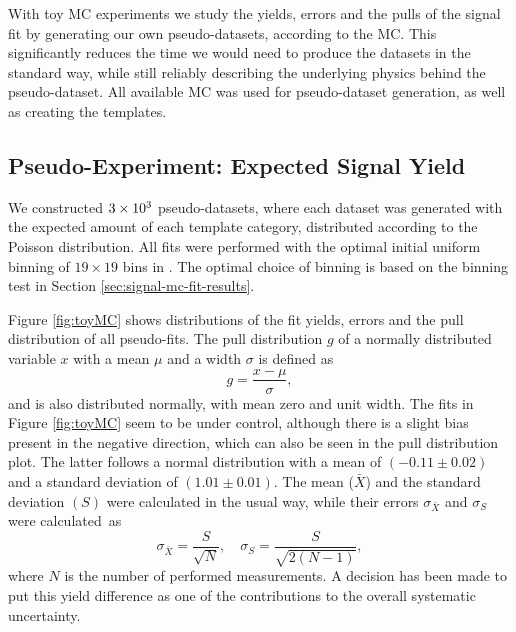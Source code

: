 With toy MC experiments we study the yields, errors and the pulls of the signal fit by generating our own pseudo-datasets, according to the MC. This significantly reduces the time we would need to produce the datasets in the standard way, while still reliably describing the underlying physics behind the pseudo-dataset. All available MC was used for pseudo-dataset generation, as well as creating the templates. 

\subsection{Pseudo-Experiment: Expected Signal Yield}

We constructed $3\times 10^{3}$ pseudo-datasets, where each dataset was generated with the expected amount of each template category, distributed according to the Poisson distribution. All fits were performed with the optimal initial uniform binning of $19 \times 19$ bins in \vars. The optimal choice of binning is based on the binning test in Section \ref{sec:signal-mc-fit-results}.

Figure \ref{fig:toyMC} shows distributions of the fit yields, errors and the pull distribution of all pseudo-fits. The pull distribution $g$ of a normally distributed variable $x$ with a mean $\mu$ and a width $\sigma$ is defined as 
\begin{equation}
g = \frac{x-\mu}{\sigma},
\end{equation}
and is also distributed normally, with mean zero and unit width. The fits in Figure \ref{fig:toyMC} seem to be under control, although there is a slight bias present in the negative direction, which can also be seen in the pull distribution plot. The latter follows a normal distribution with a mean of $(-0.11\pm0.02)$ and a standard deviation of $(1.01\pm0.01)$. The mean ($\bar X$) and the standard deviation $(S)$ were calculated in the usual way, while their errors $\sigma_{\bar X}$ and $\sigma_S$ were calculated~as~\cite{ahn2003standard}
\begin{equation}
\sigma_{\bar X} = \frac{S}{\sqrt{N}},\quad \sigma_{S} = \frac{S}{\sqrt{2(N-1)}},
\end{equation}
where $N$ is the number of performed measurements. A decision has been made to put this yield difference as one of the contributions to the overall systematic uncertainty.

